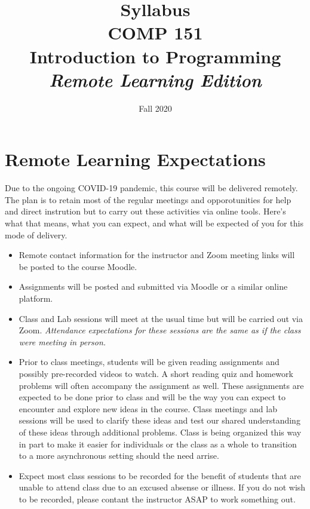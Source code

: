 \documentclass[10pt]{article}
\title{Syllabus \\ COMP 151 \\ Introduction to Programming \\ \textit{Remote Learning Edition}}
\author{  }
\date{Fall 2020}
\begin{document}
\maketitle

\section{Remote Learning Expectations}

Due to the ongoing COVID-19 pandemic, this course will be delivered remotely. The plan
is to retain most of the regular meetings and opporotunities for help and direct instrution
but to carry out these activities via online tools. Here's what that means, what you can expect,
and what will be expected of you for this mode of delivery.

\begin{itemize}
  \item Remote contact information for the instructor and Zoom meeting links will be posted to the
  course Moodle.

  \item Assignments will be posted and submitted via Moodle or a similar online platform.

  \item Class and Lab sessions will meet at the usual time but will be carried out
  via Zoom. \textit{Attendance expectations for these sessions are the same as
  if the class were meeting in person.}

  \item Prior to class meetings, students will be given reading assignments and possibly
  pre-recorded videos to watch. A short reading quiz and homework problems will often
  accompany the assignment as well. These assignments are expected to be done prior to
  class and will be the way you can expect to encounter and explore new ideas in the course.
  Class meetings and lab sessions will be used to clarify these ideas and test our
  shared understanding of these ideas through additional problems. Class is being
  organized this way in part to make it easier for individuals or the class as a whole
  to transition to a more asynchronous setting should the need arrise.

  \item Expect most class sessions to be recorded for the benefit of students that
  are unable to attend class due to an excused absense or illness. If you do not wish
  to be recorded, please contant the instructor ASAP to work something out.


\end{itemize}
\end{document}
